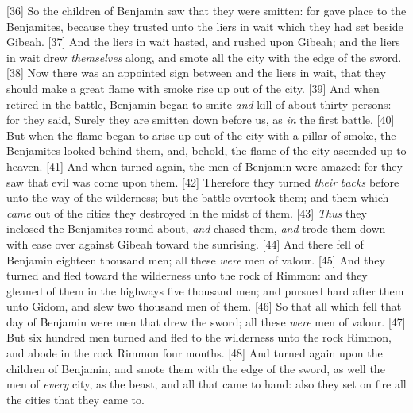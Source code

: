 [36] \textcolor[cmyk]{0.99998,1,0,0}{So the children of Benjamin saw that they were smitten: for  gave place to the Benjamites, because they trusted unto the liers in wait which they had set beside Gibeah.}
[37] \textcolor[cmyk]{0.99998,1,0,0}{And the liers in wait hasted, and rushed upon Gibeah; and the liers in wait drew \emph{themselves} along, and smote all the city with the edge of the sword.}
[38] \textcolor[cmyk]{0.99998,1,0,0}{Now there was an appointed sign between  and the liers in wait, that they should make a great flame with smoke rise up out of the city.}
[39] \textcolor[cmyk]{0.99998,1,0,0}{And when  retired in the battle, Benjamin began to smite \emph{and} kill of  about thirty persons: for they said, Surely they are smitten down before us, as \emph{in} the first battle.}
[40] \textcolor[cmyk]{0.99998,1,0,0}{But when the flame began to arise up out of the city with a pillar of smoke, the Benjamites looked behind them, and, behold, the flame of the city ascended up to heaven.}
[41] \textcolor[cmyk]{0.99998,1,0,0}{And when  turned again, the men of Benjamin were amazed: for they saw that evil was come upon them.}
[42] \textcolor[cmyk]{0.99998,1,0,0}{Therefore they turned \emph{their} \emph{backs} before  unto the way of the wilderness; but the battle overtook them; and them which \emph{came} out of the cities they destroyed in the midst of them.}
[43] \textcolor[cmyk]{0.99998,1,0,0}{\emph{Thus} they inclosed the Benjamites round about, \emph{and} chased them, \emph{and} trode them down with ease over against Gibeah toward the sunrising.}
[44] \textcolor[cmyk]{0.99998,1,0,0}{And there fell of Benjamin eighteen thousand men; all these \emph{were} men of valour.}
[45] \textcolor[cmyk]{0.99998,1,0,0}{And they turned and fled toward the wilderness unto the rock of Rimmon: and they gleaned of them in the highways five thousand men; and pursued hard after them unto Gidom, and slew two thousand men of them.}
[46] \textcolor[cmyk]{0.99998,1,0,0}{So that all which fell that day of Benjamin were  men that drew the sword; all these \emph{were} men of valour.}
[47] \textcolor[cmyk]{0.99998,1,0,0}{But six hundred men turned and fled to the wilderness unto the rock Rimmon, and abode in the rock Rimmon four months.}
[48] \textcolor[cmyk]{0.99998,1,0,0}{And  turned again upon the children of Benjamin, and smote them with the edge of the sword, as well the men of \emph{every} city, as the beast, and all that came to hand: also they set on fire all the cities that they came to.}